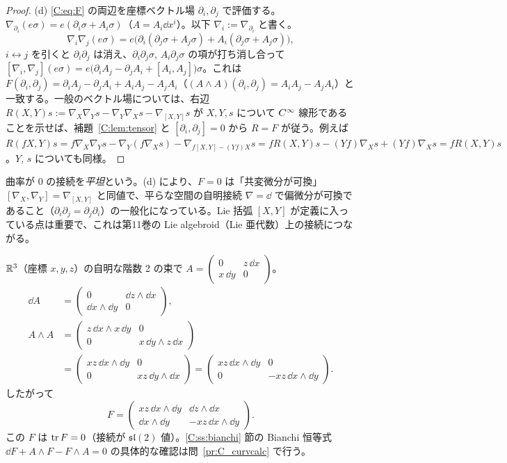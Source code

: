 \begin{proof}
(d) \eqref{C:eq:F} の両辺を座標ベクトル場 $\partial_i,\partial_j$ で評価する。$\nabla_{\partial_i}(e\sigma)=e(\partial_i\sigma+A_i\sigma)$（$A=A_i\dd x^i$）。以下 $\nabla_i:=\nabla_{\partial_i}$ と書く。
\[
\nabla_i\nabla_j(e\sigma)=e\bigl(\partial_i(\partial_j\sigma+A_j\sigma)+A_i(\partial_j\sigma+A_j\sigma)\bigr),
\]
$i\leftrightarrow j$ を引くと $\partial_i\partial_j$ は消え、$\partial_i\partial_j\sigma$, $A_i\partial_j\sigma$ の項が打ち消し合って $[\nabla_i,\nabla_j](e\sigma)=e\bigl(\partial_iA_j-\partial_jA_i+[A_i,A_j]\bigr)\sigma$。これは $F(\partial_i,\partial_j)=\partial_iA_j-\partial_jA_i+A_iA_j-A_jA_i$（$(A\wedge A)(\partial_i,\partial_j)=A_iA_j-A_jA_i$）と一致する。一般のベクトル場については、右辺 $R(X,Y)s:=\nabla_X\nabla_Ys-\nabla_Y\nabla_Xs-\nabla_{[X,Y]}s$ が $X,Y,s$ について $C^\infty$ 線形であることを示せば、補題~\ref{C:lem:tensor} と $[\partial_i,\partial_j]=0$ から $R=F$ が従う。例えば $R(fX,Y)s=f\nabla_X\nabla_Ys-\nabla_Y(f\nabla_Xs)-\nabla_{f[X,Y]-(Yf)X}s=fR(X,Y)s-(Yf)\nabla_Xs+(Yf)\nabla_Xs=fR(X,Y)s$。$Y$, $s$ についても同様。
\end{proof}

曲率が $0$ の接続を\emph{平坦}という。(d) により、$F=0$ は「共変微分が可換」$[\nabla_X,\nabla_Y]=\nabla_{[X,Y]}$ と同値で、平らな空間の自明接続 $\nabla=\dd$ で偏微分が可換であること（$\partial_i\partial_j=\partial_j\partial_i$）の一般化になっている。Lie 括弧 $[X,Y]$ が定義に入っている点は重要で、これは第11巻の Lie algebroid（Lie 亜代数）上の接続につながる。

\begin{ex}[曲率の計算]\label{C:ex:curvcalc}
$\mathbb R^3$（座標 $x,y,z$）の自明な階数 2 の束で $A=\begin{pmatrix}0&z\,\dd x\\x\,\dd y&0\end{pmatrix}$。
\begin{align*}
\dd A&=\begin{pmatrix}0&\dd z\wedge\dd x\\\dd x\wedge\dd y&0\end{pmatrix},\\
A\wedge A&=\begin{pmatrix}z\,\dd x\wedge x\,\dd y&0\\0&x\,\dd y\wedge z\,\dd x\end{pmatrix}\\
&=\begin{pmatrix}xz\,\dd x\wedge\dd y&0\\0&xz\,\dd y\wedge\dd x\end{pmatrix}=\begin{pmatrix}xz\,\dd x\wedge\dd y&0\\0&-xz\,\dd x\wedge\dd y\end{pmatrix}.
\end{align*}
したがって
\[
F=\begin{pmatrix}xz\,\dd x\wedge\dd y&\dd z\wedge\dd x\\\dd x\wedge\dd y&-xz\,\dd x\wedge\dd y\end{pmatrix}.
\]
この $F$ は $\operatorname{tr} F=0$（接続が $\mathfrak{sl}(2)$ 値）。\ref{C:ss:bianchi} 節の Bianchi 恒等式 $\dd F+A\wedge F-F\wedge A=0$ の具体的な確認は問~\ref{pr:C_curvcalc} で行う。
\end{ex}

